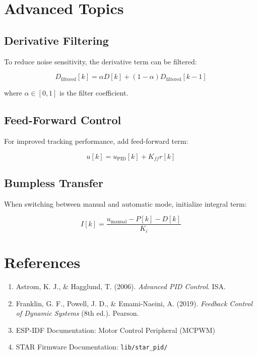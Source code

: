 \documentclass[11pt,a4paper]{article}
\begin{document}
\section{Advanced Topics}

\subsection{Derivative Filtering}

To reduce noise sensitivity, the derivative term can be filtered:

\begin{equation}
D_{\text{filtered}}[k] = \alpha D[k] + (1 - \alpha) D_{\text{filtered}}[k-1]
\end{equation}

where $\alpha \in [0, 1]$ is the filter coefficient.

\subsection{Feed-Forward Control}

For improved tracking performance, add feed-forward term:

\begin{equation}
u[k] = u_{\text{PID}}[k] + K_{ff} r[k]
\end{equation}

\subsection{Bumpless Transfer}

When switching between manual and automatic mode, initialize integral term:

\begin{equation}
I[k] = \frac{u_{\text{manual}} - P[k] - D[k]}{K_i}
\end{equation}

\section{References}

\begin{enumerate}
  \item Astrom, K. J., \& Hagglund, T. (2006). \textit{Advanced PID Control}. ISA.
  \item Franklin, G. F., Powell, J. D., \& Emami-Naeini, A. (2019). \textit{Feedback Control of Dynamic Systems} (8th ed.). Pearson.
  \item ESP-IDF Documentation: Motor Control Peripheral (MCPWM)
  \item STAR Firmware Documentation: \texttt{lib/star\_pid/}
\end{enumerate}
\end{document}
